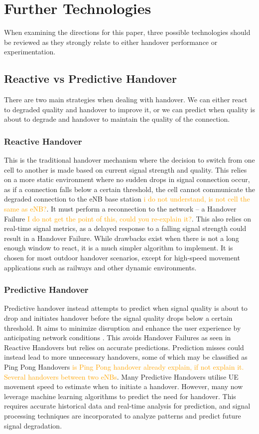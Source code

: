 \section{Further Technologies}
When examining the directions for this paper, three possible technologies should be reviewed as they strongly relate to either handover performance or experimentation. 

\subsection{Reactive vs Predictive Handover}
There are two main strategies when dealing with handover. We can either react to degraded quality and handover to improve it, or we can predict when quality is about to degrade and handover to maintain the quality of the connection.

\subsubsection*{Reactive Handover} This is the traditional handover mechanism where the decision to switch from one cell to another is made based on current signal strength and quality. This relies on a more static environment where no sudden drops in signal connection occur, as if a connection falls below a certain threshold, the cell cannot communicate the degraded connection to the eNB base station \textcolor{orange}{i do not understand, is not cell the same as eNB?}. It must perform a reconnection to the network -- a Handover Failure \textcolor{orange}{I do not get the point of this, could you re-explain it?}. This also relies on real-time signal metrics, as a delayed response to a falling signal strength could result in a Handover Failure. While drawbacks exist when there is not a long enough window to react, it is a much simpler algorithm to implement. It is chosen for most outdoor handover scenarios, except for high-speed movement applications such as railways \cite{kosmopoulos_handover_2022} and other dynamic environments.
                
\subsubsection*{Predictive Handover} Predictive handover instead attempts to predict when signal quality is about to drop and initiates handover before the signal quality drops below a certain threshold. It aims to minimize disruption and enhance the user experience by anticipating network conditions \cite{al-quraan_enhancing_2023}. This avoids Handover Failures as seen in Reactive Handovers but relies on accurate predictions. Prediction misses could instead lead to more unnecessary handovers, some of which may be classified as Ping Pong Handovers \textcolor{orange}{is Ping Pong handover already explain, if not explain it. Several handovers between two eNBs}.  Many Predictive Handovers utilise UE movement speed to estimate when to initiate a handover. However, many now leverage machine learning algorithms to predict the need for handover. This requires accurate historical data and real-time analysis for prediction, and signal processing techniques are incorporated to analyze patterns and predict future signal degradation.


